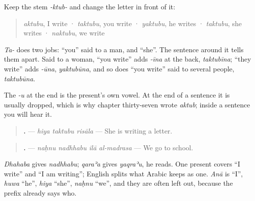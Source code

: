 \begin{grammarlens}[title={Grammar Lens: one stem, four prefixes}]
Keep the stem \emph{-ktub-} and change the letter in front of it:

\begin{quote}
\textbf{} \emph{aktubu}, I write · \textbf{} \emph{taktubu}, you write · \textbf{} \emph{yaktubu}, he writes · \textbf{} \emph{taktubu}, she writes · \textbf{} \emph{naktubu}, we write
\end{quote}

\emph{Ta-} does two jobs: \textquotedblleft{}you\textquotedblright{} said to a man, and \textquotedblleft{}she\textquotedblright{}. The sentence around it tells them apart. Said to a woman, \textquotedblleft{}you write\textquotedblright{} adds \emph{-īna} at the back, \emph{taktubīna}; \textquotedblleft{}they write\textquotedblright{} adds \emph{-ūna}, \emph{yaktubūna}, and so does \textquotedblleft{}you write\textquotedblright{} said to several people, \emph{taktubūna}.

The \emph{-u} at the end is the present's own vowel. At the end of a sentence it is usually dropped, which is why chapter thirty-seven wrote \emph{aktub}; inside a sentence you will hear it.
\end{grammarlens}

\begin{grammarlens}[title={Grammar Lens: the same door on other verbs}]
\begin{quote}
\textbf{  .} — \emph{hiya taktubu risāla} — She is writing a letter.
\end{quote}

\begin{quote}
\textbf{   .} — \emph{naḥnu nadhhabu ilā al-madrasa} — We go to school.
\end{quote}

\emph{Dhahaba} gives \emph{nadhhabu}; \emph{qaraʾa} gives \emph{yaqraʾu}, he reads. One present covers \textquotedblleft{}I write\textquotedblright{} and \textquotedblleft{}I am writing\textquotedblright{}; English splits what Arabic keeps as one. \emph{Anā} is \textquotedblleft{}I\textquotedblright{}, \emph{huwa} \textquotedblleft{}he\textquotedblright{}, \emph{hiya} \textquotedblleft{}she\textquotedblright{}, \emph{naḥnu} \textquotedblleft{}we\textquotedblright{}, and they are often left out, because the prefix already says who.
\end{grammarlens}

